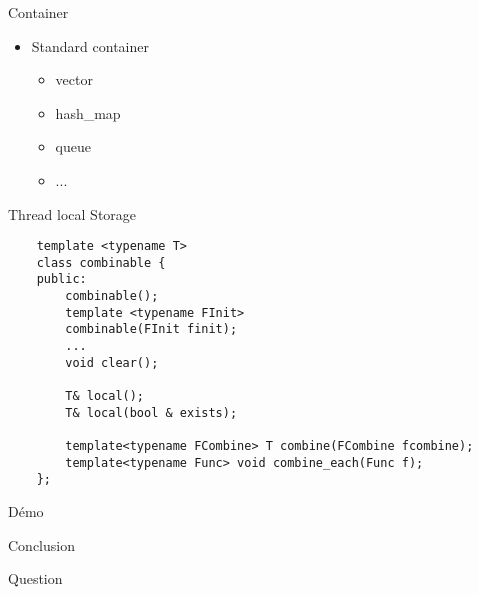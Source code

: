 \documentclass[11pt]{beamer}
\begin{document}
\begin{frame}{Container}
	\begin{itemize}
		\item Standard container
		\begin{itemize}
			\item vector
			\item hash\_map
			\item queue
			\item ...
		\end{itemize}
	\end{itemize}
\end{frame}

\begin{frame}[fragile]{Thread local Storage}
\lstset{style=customcpp}
\lstset{language=C++}
\begin{lstlisting}
    template <typename T>
    class combinable {
    public:
        combinable();
        template <typename FInit>
        combinable(FInit finit);     
        ...
        void clear();
 
        T& local();
        T& local(bool & exists);
 
        template<typename FCombine> T combine(FCombine fcombine);
        template<typename Func> void combine_each(Func f);
    };
\end{lstlisting}
\end{frame}

\begin{frame}{Démo}

\end{frame}

\begin{frame}{Conclusion}

\end{frame}

\begin{frame}{Question}

\end{frame}
\end{document}
